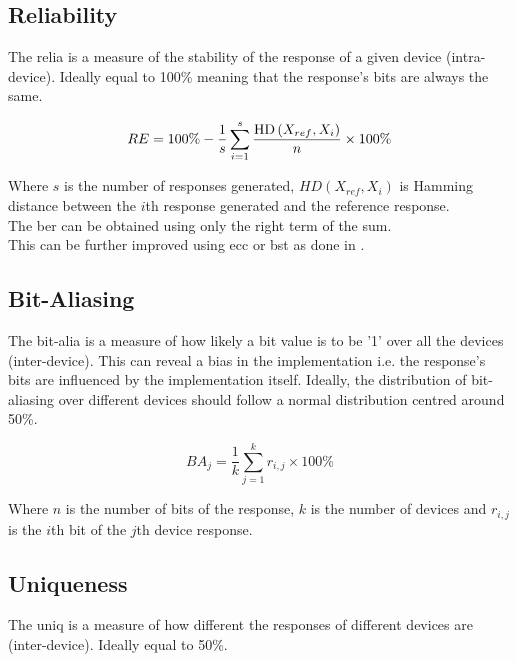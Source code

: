 \subsection{Reliability}


The \acrfull{relia} is a measure of the stability of the response of a given device (intra-device). Ideally equal to 100\% meaning that the response's bits are always the same.

\begin{equation}
     RE = 100\% - \frac{1}{s} \sum_{i=1}^s \frac{\mathrm{HD}\left(X_{ref}, X_i\right)}{n} \times 100 \% \\
\end{equation}

Where $s$ is the number of responses generated, $HD(X_{ref}, X_i)$ is Hamming distance between the $i$th response generated and the reference response.\\

The \acrfull{ber} can be obtained using only the right term of the sum.\\

This can be further improved using \acrfull{ecc} or \acrshort{bst} as done in \cite{he_highly_2020, he_highly_2021}.

\subsection{Bit-Aliasing}

The \acrfull{bit-alia} is a measure of how likely a bit value is to be '1' over all the devices (inter-device). This can reveal a bias in the implementation i.e. the response's bits are influenced by the implementation itself. Ideally, the distribution of bit-aliasing over different devices should follow a normal distribution centred around 50\%.

\begin{equation}
    BA_j = \frac{1}{k} \sum_{j=1}^{k} r_{i,j} \times 100\%
\end{equation}

Where $n$ is the number of bits of the response, $k$ is the number of devices and $r_{i,j}$ is the $i$th bit of the $j$th device response.

\subsection{Uniqueness}

The \acrfull{uniq} is a measure of how different the responses of different devices are (inter-device). Ideally equal to 50\%.

